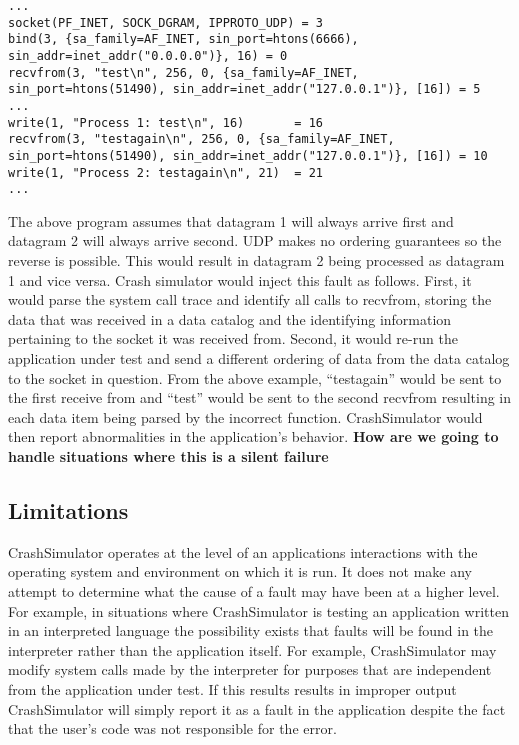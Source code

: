         \begin{verbatim}
...
socket(PF_INET, SOCK_DGRAM, IPPROTO_UDP) = 3
bind(3, {sa_family=AF_INET, sin_port=htons(6666), sin_addr=inet_addr("0.0.0.0")}, 16) = 0
recvfrom(3, "test\n", 256, 0, {sa_family=AF_INET, sin_port=htons(51490), sin_addr=inet_addr("127.0.0.1")}, [16]) = 5
...
write(1, "Process 1: test\n", 16)       = 16
recvfrom(3, "testagain\n", 256, 0, {sa_family=AF_INET, sin_port=htons(51490), sin_addr=inet_addr("127.0.0.1")}, [16]) = 10
write(1, "Process 2: testagain\n", 21)  = 21
...
        \end{verbatim}

        The above program assumes that datagram 1 will always arrive first and datagram 2 will always arrive second. UDP
        makes no ordering guarantees so the reverse is possible. This would result in datagram 2 being processed as
        datagram 1 and vice versa. Crash simulator would inject this fault as follows. First, it would parse the system
        call trace and identify all calls to recvfrom, storing the data that was received in a data catalog and the
        identifying information pertaining to the socket it was received from. Second, it would re-run the application
        under test and send a different ordering of data from the data catalog to the socket in question. From the above
        example, ``testagain'' would be sent to the first receive from and ``test'' would be sent to the second recvfrom
        resulting in each data item being parsed by the incorrect function. CrashSimulator would then report
        abnormalities in the application's behavior. \textbf{How are we going to handle situations where this is a
        silent failure}

    \subsection{Limitations}

        CrashSimulator operates at the level of an applications interactions with the operating system and environment
        on which it is run. It does not make any attempt to determine what the cause of a fault may have been at a
        higher level. For example, in situations where CrashSimulator is testing an application written in an
        interpreted language the possibility exists that faults will be found in the interpreter rather than the
        application itself. For example, CrashSimulator may modify system calls made by the interpreter for purposes
        that are independent from the application under test. If this results results in improper output CrashSimulator
        will simply report it as a fault in the application despite the fact that the user's code was not responsible
        for the error.

